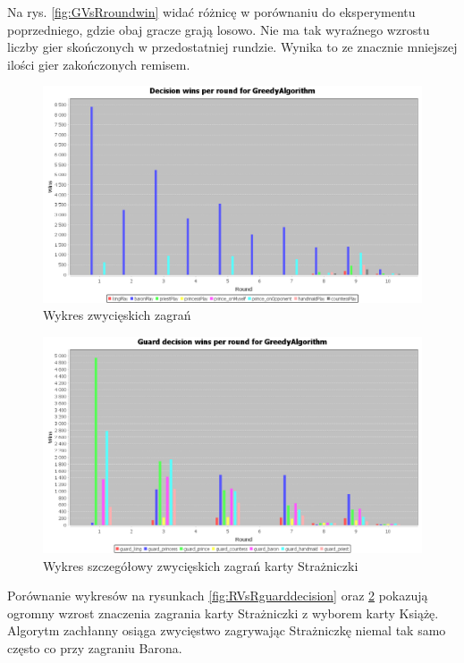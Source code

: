 Na rys. \ref{fig:GVsRroundwin} widać różnicę w porównaniu do eksperymentu poprzedniego, gdzie obaj gracze grają losowo. Nie ma tak wyraźnego wzrostu liczby gier skończonych w przedostatniej rundzie. Wynika to ze znacznie mniejszej ilości gier zakończonych remisem.

\clearpage
\begin{figure}[H]
	\centering
	\includegraphics[width=\textwidth]{Resources/GVsR/GVsRdecision.PNG}
	\caption{Wykres zwycięskich zagrań} 
	\label{fig:GVsRdecision}
\end{figure} 

\begin{figure}[H]
	\centering
	\includegraphics[width=\textwidth]{Resources/GVsR/GVsRguarddecision.PNG}
	\caption{Wykres szczegółowy zwycięskich zagrań karty Strażniczki} 
	\label{fig:GVsRguarddecision}
\end{figure}

Porównanie wykresów na rysunkach \ref{fig:RVsRguarddecision} oraz \ref{fig:GVsRguarddecision} pokazują ogromny wzrost znaczenia zagrania karty Strażniczki z wyborem karty Książę. Algorytm zachłanny osiąga zwycięstwo zagrywając Strażniczkę niemal tak samo często co przy zagraniu Barona.

